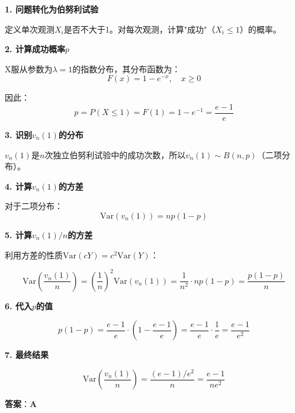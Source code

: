 \documentclass[standard]{ExBook}
\begin{document}
\begin{qitems}
\begin{bbox}
\begin{solution}
            \textbf{1. 问题转化为伯努利试验}
            
            定义单次观测$X_i$是否不大于1。对每次观测，计算"成功"（$X_i \le 1$）的概率。
            
            \textbf{2. 计算成功概率$p$}
            
            X服从参数为$\lambda=1$的指数分布，其分布函数为：
            $$F(x) = 1-e^{-x}, \quad x \ge 0$$
            
            因此：
            $$p = P(X \le 1) = F(1) = 1-e^{-1} = \frac{e-1}{e}$$
            
            \textbf{3. 识别$v_n(1)$的分布}
            
            $v_n(1)$是$n$次独立伯努利试验中的成功次数，所以$v_n(1) \sim B(n, p)$（二项分布）。
            
            \textbf{4. 计算$v_n(1)$的方差}
            
            对于二项分布：$$\text{Var}(v_n(1)) = np(1-p)$$
            
            \textbf{5. 计算$v_n(1)/n$的方差}
            
            利用方差的性质$\text{Var}(cY) = c^2 \text{Var}(Y)$：
            
            $$\text{Var}\left(\frac{v_n(1)}{n}\right) = \left(\frac{1}{n}\right)^2 \text{Var}(v_n(1)) = \frac{1}{n^2} \cdot np(1-p) = \frac{p(1-p)}{n}$$
            
            \textbf{6. 代入$p$的值}
            
            $$p(1-p) = \frac{e-1}{e} \cdot \left(1 - \frac{e-1}{e}\right) = \frac{e-1}{e} \cdot \frac{1}{e} = \frac{e-1}{e^2}$$
            
            \textbf{7. 最终结果}
            
            $$\text{Var}\left(\frac{v_n(1)}{n}\right) = \frac{(e-1)/e^2}{n} = \frac{e-1}{ne^2}$$
            
            \textbf{答案}：\textbf{A}
        \end{solution}
    \end{bbox}

\end{qitems}
\end{document}
